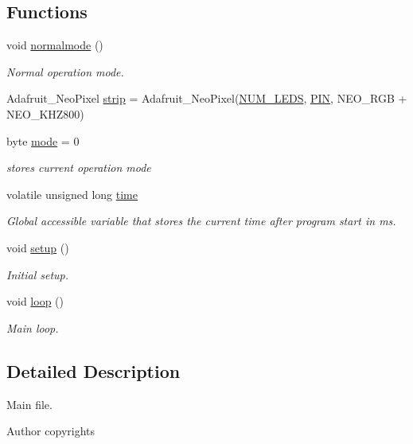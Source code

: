 \subsection*{Functions}
\begin{DoxyCompactItemize}
\item 
void \hyperlink{group__car_gaa0a39b0689218537e29a29f9c3f2af47}{normalmode} ()
\begin{DoxyCompactList}\small\item\em Normal operation mode. \end{DoxyCompactList}\end{DoxyCompactItemize}
\begin{DoxyCompactItemize}
\item 
Adafruit\+\_\+\+Neo\+Pixel \hyperlink{group__main_gacf2771bd8bfaf855bbcc6c30301bf380}{strip} = Adafruit\+\_\+\+Neo\+Pixel(\hyperlink{group__deployment_ga4c4ae9a4146ce8d6a5debc90300d9abd}{N\+U\+M\+\_\+\+L\+E\+DS}, \hyperlink{group__deployment_gae1a27401b7fb01ccb9a82dbddbb54eea}{P\+IN}, N\+E\+O\+\_\+\+R\+GB + N\+E\+O\+\_\+\+K\+H\+Z800)
\item 
byte \hyperlink{group__main_ga988166baebc4b27bd18de27cd40f8b5a}{mode} = 0
\begin{DoxyCompactList}\small\item\em stores current operation mode \end{DoxyCompactList}\item 
volatile unsigned long \hyperlink{group__main_ga4f944bfefd58754546ebcc7c5143442c}{time}
\begin{DoxyCompactList}\small\item\em Global accessible variable that stores the current time after program start in ms. \end{DoxyCompactList}\item 
void \hyperlink{group__main_ga4fc01d736fe50cf5b977f755b675f11d}{setup} ()
\begin{DoxyCompactList}\small\item\em Initial setup. \end{DoxyCompactList}\item 
void \hyperlink{group__main_gafe461d27b9c48d5921c00d521181f12f}{loop} ()
\begin{DoxyCompactList}\small\item\em Main loop. \end{DoxyCompactList}\end{DoxyCompactItemize}


\subsection{Detailed Description}
Main file. 

\begin{DoxyAuthor}{Author}
copyrights 
\end{DoxyAuthor}
